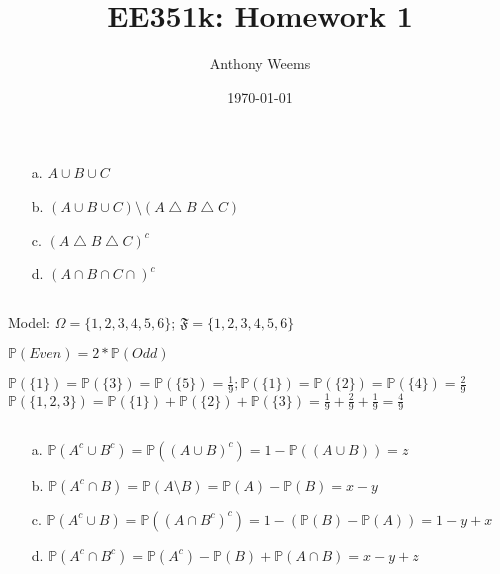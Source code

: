 \documentclass{article}
\begin{document}
\title{EE351k: Homework 1}
\author{Anthony Weems}
\date{\today}
\maketitle

\subsection{}
\begin{enumerate}
    \item[a.] \( A \cup B \cup C \)
    \item[b.] \( (A \cup B \cup C) \setminus (A \bigtriangleup B \bigtriangleup C) \)
    \item[c.] \( (A \bigtriangleup B \bigtriangleup C )^c \)
    \item[d.] \( (A \cap B \cap C \cap)^c \)
\end{enumerate}

\subsection{}
Model:
\( \Omega = \{1, 2, 3, 4, 5, 6\}\); \( \mathfrak{F} = \{ 1, 2, 3, 4, 5, 6 \} \)

\( \mathbb{P}(Even) = 2*\mathbb{P}(Odd) \)

\( \mathbb{P}(\{1\}) = \mathbb{P}(\{3\})= \mathbb{P}(\{5\}) = \frac{1}{9};
\mathbb{P}(\{1\}) = \mathbb{P}(\{2\})= \mathbb{P}(\{4\}) = \frac{2}{9}\) \\

\( \mathbb{P}(\{1, 2, 3\}) = \mathbb{P}(\{1\}) + \mathbb{P}(\{2\}) + \mathbb{P}(\{3\}) = \frac{1}{9} + \frac{2}{9} + \frac{1}{9} = \frac{4}{9} \)

\subsection{}

\begin{enumerate}
    \item[a.] \( \mathbb{P}(A^c \cup B^c) = \mathbb{P}((A \cup B)^c) = 1 - \mathbb{P}((A \cup B)) = z \)
    \item[b.] \( \mathbb{P}(A^c \cap B) = \mathbb{P}(A \setminus B) = \mathbb{P}(A) - \mathbb{P}(B) = x - y  \)
    \item[c.] \( \mathbb{P}(A^c \cup B) = \mathbb{P}((A \cap B^c)^c) = 1 - (\mathbb{P}(B) - \mathbb{P}(A)) = 1 - y + x \)
    \item[d.] \( \mathbb{P}(A^c \cap B^c) = \mathbb{P}(A^c) - \mathbb{P}(B) + \mathbb{P}(A \cap B) = x - y + z \)
\end{enumerate}
\end{document}

